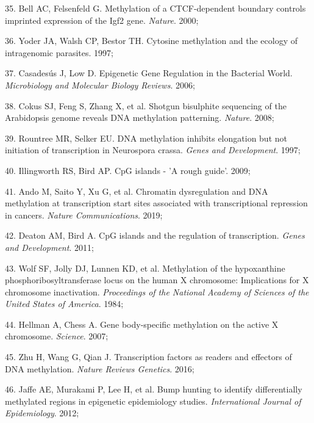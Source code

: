 \documentclass[11pt,oneside]{bristolthesis}
\newenvironment{cslreferences}%
  {}%
  {\par}
\begin{document}
\begin{cslreferences}
\leavevmode\hypertarget{ref-Bell2000}{}%
35. Bell AC, Felsenfeld G. Methylation of a CTCF-dependent boundary controls imprinted expression of the Igf2 gene. \emph{Nature}. 2000;

\leavevmode\hypertarget{ref-Yoder1997}{}%
36. Yoder JA, Walsh CP, Bestor TH. Cytosine methylation and the ecology of intragenomic parasites. 1997;

\leavevmode\hypertarget{ref-Casadesus2006}{}%
37. Casadesús J, Low D. Epigenetic Gene Regulation in the Bacterial World. \emph{Microbiology and Molecular Biology Reviews}. 2006;

\leavevmode\hypertarget{ref-Cokus2008}{}%
38. Cokus SJ, Feng S, Zhang X, et al. Shotgun bisulphite sequencing of the Arabidopsis genome reveals DNA methylation patterning. \emph{Nature}. 2008;

\leavevmode\hypertarget{ref-Rountree1997}{}%
39. Rountree MR, Selker EU. DNA methylation inhibits elongation but not initiation of transcription in Neurospora crassa. \emph{Genes and Development}. 1997;

\leavevmode\hypertarget{ref-Illingworth2009}{}%
40. Illingworth RS, Bird AP. CpG islands - 'A rough guide'. 2009;

\leavevmode\hypertarget{ref-Ando2019}{}%
41. Ando M, Saito Y, Xu G, et al. Chromatin dysregulation and DNA methylation at transcription start sites associated with transcriptional repression in cancers. \emph{Nature Communications}. 2019;

\leavevmode\hypertarget{ref-Deaton2011}{}%
42. Deaton AM, Bird A. CpG islands and the regulation of transcription. \emph{Genes and Development}. 2011;

\leavevmode\hypertarget{ref-Wolf1984}{}%
43. Wolf SF, Jolly DJ, Lunnen KD, et al. Methylation of the hypoxanthine phosphoribosyltransferase locus on the human X chromosome: Implications for X chromosome inactivation. \emph{Proceedings of the National Academy of Sciences of the United States of America}. 1984;

\leavevmode\hypertarget{ref-Hellman2007}{}%
44. Hellman A, Chess A. Gene body-specific methylation on the active X chromosome. \emph{Science}. 2007;

\leavevmode\hypertarget{ref-Zhu2016}{}%
45. Zhu H, Wang G, Qian J. Transcription factors as readers and effectors of DNA methylation. \emph{Nature Reviews Genetics}. 2016;

\leavevmode\hypertarget{ref-Jaffe2012}{}%
46. Jaffe AE, Murakami P, Lee H, et al. Bump hunting to identify differentially methylated regions in epigenetic epidemiology studies. \emph{International Journal of Epidemiology}. 2012;


\end{cslreferences}
\end{document}
